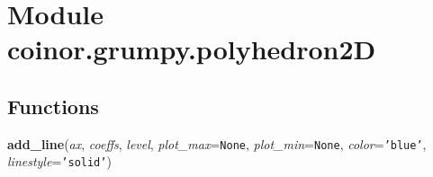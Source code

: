 %
%
%


\section{Module coinor.grumpy.polyhedron2D}

    \label{coinor:grumpy:polyhedron2D}


  \subsection{Functions}

    \label{coinor:grumpy:polyhedron2D:add_line}

    \vspace{0.5ex}

\hspace{.8\funcindent}\begin{boxedminipage}{\funcwidth}

    \raggedright \textbf{add\_line}(\textit{ax}, \textit{coeffs}, \textit{level}, \textit{plot\_max}={\tt None}, \textit{plot\_min}={\tt None}, \textit{color}={\tt \texttt{'}\texttt{blue}\texttt{'}}, \textit{linestyle}={\tt \texttt{'}\texttt{solid}\texttt{'}})

\setlength{\parskip}{2ex}
\setlength{\parskip}{1ex}
    \end{boxedminipage}




